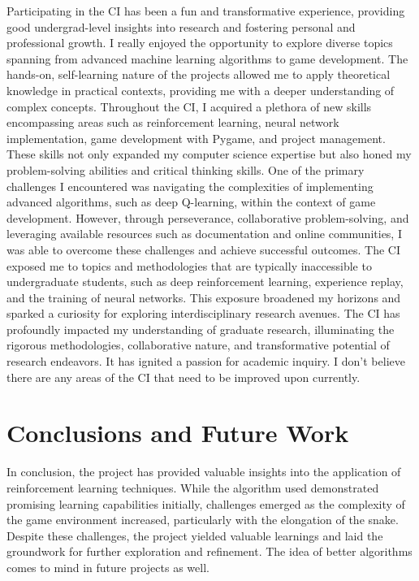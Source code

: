 \documentclass[paper=a4, fontsize=11pt,twoside]{scrartcl}
\begin{document}
Participating in the CI has been a fun and transformative experience, providing good undergrad-level insights into research and fostering personal and professional growth. I really enjoyed the opportunity to explore diverse topics spanning from advanced machine learning algorithms to game development. The hands-on, self-learning nature of the projects allowed me to apply theoretical knowledge in practical contexts, providing me with a deeper understanding of complex concepts. Throughout the CI, I acquired a plethora of new skills encompassing areas such as reinforcement learning, neural network implementation, game development with Pygame, and project management. These skills not only expanded my computer science expertise but also honed my problem-solving abilities and critical thinking skills. One of the primary challenges I encountered was navigating the complexities of implementing advanced algorithms, such as deep Q-learning, within the context of game development. However, through perseverance, collaborative problem-solving, and leveraging available resources such as documentation and online communities, I was able to overcome these challenges and achieve successful outcomes. The CI exposed me to topics and methodologies that are typically inaccessible to undergraduate students, such as deep reinforcement learning, experience replay, and the training of neural networks. This exposure broadened my horizons and sparked a curiosity for exploring interdisciplinary research avenues. The CI has profoundly impacted my understanding of graduate research, illuminating the rigorous methodologies, collaborative nature, and transformative potential of research endeavors. It has ignited a passion for academic inquiry. I don't believe there are any areas of the CI that need to be improved upon currently. 

\section{Conclusions and Future Work}

In conclusion, the project has provided valuable insights into the application of reinforcement learning techniques. While the algorithm used demonstrated promising learning capabilities initially, challenges emerged as the complexity of the game environment increased, particularly with the elongation of the snake. Despite these challenges, the project yielded valuable learnings and laid the groundwork for further exploration and refinement. The idea of better algorithms comes to mind in future projects as well.\\
\end{document}
